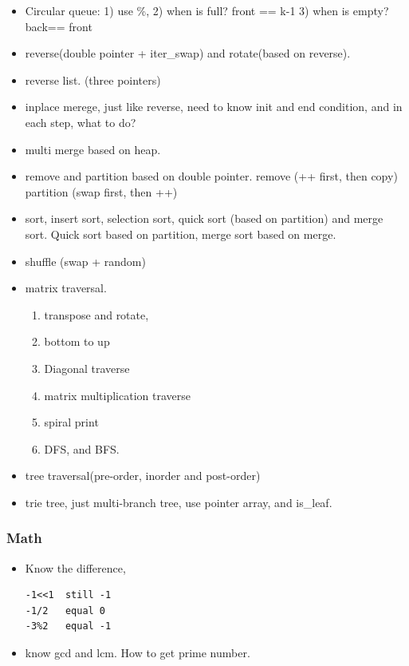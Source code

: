 \documentclass[a4paper,11pt,twoside]{book}
\begin{document}
\begin{itemize}
	\item Circular queue: 1) use \%, 2) when is full? front == k-1  3) when is empty? back== front 
	
	\item reverse(double pointer + iter\_swap) and rotate(based on reverse).
	
	\item reverse list. (three pointers) 
	
	\item inplace merege, just like reverse, need to know init and end condition, and in each step, what to do?
	
	\item multi merge based on heap.  
	
	\item remove and partition based on double pointer. remove (++ first, then copy) partition (swap first, then ++)
	
	\item sort, insert sort, selection sort, quick sort (based on partition) and merge sort. Quick sort based on partition, merge sort based on merge.
	
	\item shuffle (swap + random)
	
	\item matrix traversal.
\begin{enumerate}
	\item transpose and rotate,
	\item bottom to up
	\item Diagonal traverse
	\item matrix multiplication traverse
	\item spiral print
	\item DFS, and BFS.
\end{enumerate}
	
	\item tree traversal(pre-order, inorder and post-order)
	
	\item trie tree, just multi-branch tree, use pointer array, and is\_leaf. 
\end{itemize}	
	
\subsubsection{Math}
\begin{itemize}
	\item  Know the difference, 
\begin{lstlisting}
-1<<1  still -1
-1/2   equal 0
-3%2   equal -1	
\end{lstlisting}	

	\item know gcd and lcm. How to get prime number. 
\end{itemize}
	
\end{document}
